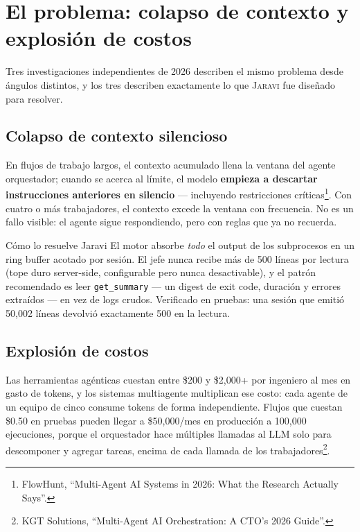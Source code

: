\documentclass[11pt]{article}
\newcommand{\jaravi}{\textsc{Jaravi}\xspace}
\begin{document}
\section{El problema: colapso de contexto y explosión de costos}

Tres investigaciones independientes de 2026 describen el mismo problema desde ángulos distintos, y los tres describen exactamente lo que \jaravi fue diseñado para resolver.

\subsection{Colapso de contexto silencioso}
En flujos de trabajo largos, el contexto acumulado llena la ventana del agente orquestador; cuando se acerca al límite, el modelo \textbf{empieza a descartar instrucciones anteriores en silencio} --- incluyendo restricciones críticas\footnote{FlowHunt, ``Multi-Agent AI Systems in 2026: What the Research Actually Says''.}. Con cuatro o más trabajadores, el contexto excede la ventana con frecuencia. No es un fallo visible: el agente sigue respondiendo, pero con reglas que ya no recuerda.

\begin{callout}[jaraviaccent]{Cómo lo resuelve Jaravi}
El motor absorbe \emph{todo} el output de los subprocesos en un ring buffer acotado por sesión. El jefe nunca recibe más de 500 líneas por lectura (tope duro server-side, configurable pero nunca desactivable), y el patrón recomendado es leer \texttt{get\_summary} --- un digest de exit code, duración y errores extraídos --- en vez de logs crudos. Verificado en pruebas: una sesión que emitió 50{,}002 líneas devolvió exactamente 500 en la lectura.
\end{callout}

\subsection{Explosión de costos}
Las herramientas agénticas cuestan entre \$200 y \$2{,}000+ por ingeniero al mes en gasto de tokens, y los sistemas multiagente multiplican ese costo: cada agente de un equipo de cinco consume tokens de forma independiente. Flujos que cuestan \$0.50 en pruebas pueden llegar a \$50{,}000/mes en producción a 100{,}000 ejecuciones, porque el orquestador hace múltiples llamadas al LLM solo para descomponer y agregar tareas, encima de cada llamada de los trabajadores\footnote{KGT Solutions, ``Multi-Agent AI Orchestration: A CTO's 2026 Guide''.}.
\end{document}
